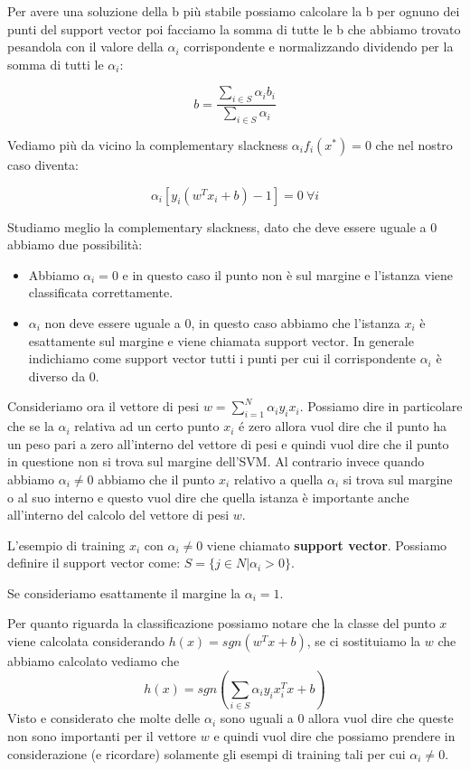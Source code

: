 \documentclass[14pt]{extreport}
\begin{document}
Per avere una soluzione della b più stabile possiamo calcolare la b per ognuno dei punti del support vector poi facciamo la somma di tutte le b che
abbiamo trovato pesandola con il valore della $\alpha_i$ corrispondente e normalizzando dividendo per la somma di tutti le $\alpha_i$:

$$b = \frac{\sum_{i \in S}\alpha_i b_i}{\sum_{i \in S}\alpha_i}$$


Vediamo più da vicino la complementary slackness $\alpha_if_i(x^*)=0$ che nel nostro caso diventa:

$$\alpha_i[y_i(w^Tx_i+b)-1]=0 \ \forall i$$

Studiamo meglio la complementary slackness, dato che deve essere uguale a 0 abbiamo due possibilità:
\begin{itemize}
	\item Abbiamo $\alpha_i=0$ e in questo caso il punto non è sul margine e l'istanza viene classificata correttamente.
	\item $\alpha_i$ non deve essere uguale a 0, in questo caso abbiamo che l'istanza $x_i$ è esattamente sul margine e viene chiamata support vector.
	      In generale indichiamo come support vector tutti i punti per cui il corrispondente $\alpha_i$ è diverso da 0.
\end{itemize}

Consideriamo ora il vettore di pesi $w=\sum_{i=1}^N \alpha_iy_ix_i$. Possiamo dire in particolare che se la $\alpha_i$  relativa ad un certo punto
$x_i$ é zero allora vuol dire che il punto ha un peso pari a zero all'interno del vettore di pesi e quindi vuol dire che il punto in questione non si
trova sul margine dell'SVM. Al contrario invece quando abbiamo $\alpha_i \not = 0$ abbiamo che il punto $x_i$ relativo a quella $\alpha_i$ si trova
sul margine o al suo interno e questo vuol dire che quella istanza è importante anche all'interno del calcolo del vettore di pesi $w$.


L'esempio di training $x_i$ con $\alpha_i \not = 0$ viene chiamato \textbf{support vector}. Possiamo definire il support vector come: $S = \{j \in N |
\alpha_i > 0\}$.

Se consideriamo esattamente il margine la $\alpha_i = 1$.


Per quanto riguarda la classificazione possiamo notare che la classe del punto $x$ viene calcolata considerando $h(x) = sgn(w^Tx+b)$, se ci
sostituiamo la $w$ che abbiamo calcolato vediamo che
$$h(x)=sgn(\sum_{i \in S}\alpha_iy_ix_i^Tx+b)$$ Visto e considerato che molte delle $\alpha_i$ sono uguali a 0 allora vuol dire che queste non sono
importanti per il vettore $w$ e quindi vuol dire che possiamo prendere in considerazione (e ricordare) solamente gli esempi di training tali per cui
$\alpha_i \not = 0$.
\end{document}

